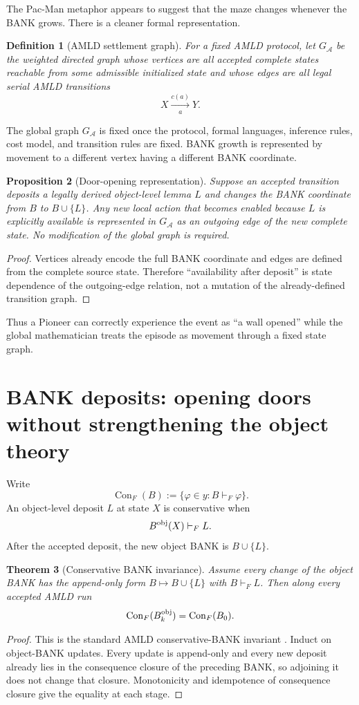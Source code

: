 \documentclass[11pt]{article}
\newtheorem{definition}{Definition}[section]
\newtheorem{theorem}[definition]{Theorem}
\newtheorem{proposition}[definition]{Proposition}
\theoremstyle{remark}
\newcommand{\Con}{\operatorname{Con}}
\begin{document}
The Pac-Man metaphor appears to suggest that the maze changes whenever the BANK grows. There is a cleaner formal representation.

\begin{definition}[AMLD settlement graph]
For a fixed AMLD protocol, let $G_{\mathcal A}$ be the weighted directed graph whose vertices are all accepted complete states reachable from some admissible initialized state and whose edges are all legal serial AMLD transitions
\[
X\xrightarrow[a]{c(a)}Y.
\]
\end{definition}

The global graph $G_{\mathcal A}$ is fixed once the protocol, formal languages, inference rules, cost model, and transition rules are fixed. BANK growth is represented by movement to a different vertex having a different BANK coordinate.

\begin{proposition}[Door-opening representation]
Suppose an accepted transition deposits a legally derived object-level lemma $L$ and changes the BANK coordinate from $B$ to $B\cup\{L\}$. Any new local action that becomes enabled because $L$ is explicitly available is represented in $G_{\mathcal A}$ as an outgoing edge of the new complete state. No modification of the global graph is required.
\end{proposition}
\begin{proof}
Vertices already encode the full BANK coordinate and edges are defined from the complete source state. Therefore ``availability after deposit'' is state dependence of the outgoing-edge relation, not a mutation of the already-defined transition graph.
\end{proof}

Thus a Pioneer can correctly experience the event as ``a wall opened'' while the global mathematician treats the episode as movement through a fixed state graph.

\section{BANK deposits: opening doors without strengthening the object theory}

Write
\[
\Con_F(B):=\{\varphi\in y:B\vdash_F\varphi\}.
\]
An object-level deposit $L$ at state $X$ is conservative when
\[
B^{\rm obj}(X)\vdash_F L.
\]
After the accepted deposit, the new object BANK is $B\cup\{L\}$.

\begin{theorem}[Conservative BANK invariance]
Assume every change of the object BANK has the append-only form $B\mapsto B\cup\{L\}$ with $B\vdash_F L$. Then along every accepted AMLD run
\[
\Con_F(B_k^{\rm obj})=\Con_F(B_0).
\]
\end{theorem}
\begin{proof}
This is the standard AMLD conservative-BANK invariant \cite{Tenneson48}. Induct on object-BANK updates. Every update is append-only and every new deposit already lies in the consequence closure of the preceding BANK, so adjoining it does not change that closure. Monotonicity and idempotence of consequence closure give the equality at each stage.
\end{proof}
\end{document}
